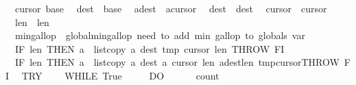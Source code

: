 \begin{isabellebody}
\ \ {\isasymacute}cursor{}\ {\isacharcolon}{\isacharequal}{\isacharequal}{\isasymacute}base{}{\isacharsemicolon}{\isacharsemicolon}\isanewline
\ \ {\isasymacute}dest\ {\isacharcolon}{\isacharequal}{\isacharequal}\ {\isasymacute}base{}{\isacharsemicolon}{\isacharsemicolon}\isanewline
\ \ {\isasymacute}a{\isacharbang}{\isasymacute}dest\ {\isacharcolon}{\isacharequal}{\isacharequal}\ {\isasymacute}a{\isacharbang}{\isasymacute}cursor{}{\isacharsemicolon}{\isacharsemicolon}\isanewline
\ \ {\isasymacute}dest\ {\isacharcolon}{\isacharequal}{\isacharequal}\ {\isasymacute}dest{\isacharplus}{}{\isacharsemicolon}{\isacharsemicolon}\isanewline
\ \ {\isasymacute}cursor{}\ {\isacharcolon}{\isacharequal}{\isacharequal}\ {\isasymacute}cursor{}{\isacharplus}{}{\isacharsemicolon}{\isacharsemicolon}\isanewline
\ \ {\isasymacute}len{}\ {\isacharcolon}{\isacharequal}{\isacharequal}\ {\isasymacute}len{}{\isacharminus}{}{\isacharsemicolon}{\isacharsemicolon}\isanewline
\ \ {\isasymacute}min{\isacharunderscore}gallop\ {\isacharcolon}{\isacharequal}{\isacharequal}\ {\isasymacute}global{\isacharunderscore}min{\isacharunderscore}gallop{\isacharsemicolon}{\isacharsemicolon}{\isacharparenleft}{\isacharasterisk}\ need\ to\ add\ min\ gallop\ to\ globals\ var\ {\isacharasterisk}{\isacharparenright}\isanewline
\ \ IF\ {\isasymacute}len{}{\isacharequal}{}\ THEN\ {\isasymacute}a\ {\isacharcolon}{\isacharequal}{\isacharequal}\ list{\isacharunderscore}copy\ {\isasymacute}a\ {\isasymacute}dest\ {\isasymacute}tmp\ {\isasymacute}cursor{}\ {\isasymacute}len{}{\isacharsemicolon}{\isacharsemicolon}\ THROW\ FI{\isacharsemicolon}{\isacharsemicolon}\isanewline
\ \ IF\ {\isasymacute}len{}{\isacharequal}{}\ THEN\ {\isasymacute}a\ {\isacharcolon}{\isacharequal}{\isacharequal}\ list{\isacharunderscore}copy\ {\isasymacute}a\ {\isasymacute}dest\ {\isasymacute}a\ {\isasymacute}cursor{}\ {\isasymacute}len{}{\isacharsemicolon}{\isacharsemicolon}\ {\isasymacute}a{\isacharbang}{\isacharparenleft}{\isasymacute}dest{\isacharplus}{\isasymacute}len{}{\isacharparenright}{\isacharcolon}{\isacharequal}{\isacharequal}\ {\isasymacute}tmp{\isacharbang}{\isasymacute}cursor{}{\isacharsemicolon}{\isacharsemicolon}THROW\ FI{\isacharsemicolon}{\isacharsemicolon}\isanewline
\ \ TRY\isanewline
\ \ \ \ WHILE\ True\ \isanewline
\ \ \ \ DO\isanewline
\ \ \ \ \ \ {\isasymacute}count{}\ {\isacharcolon}{\isacharequal}{\isacharequal}\ {}{\isacharsemicolon}{\isacharsemicolon}\isanewline

\end{isabellebody}
